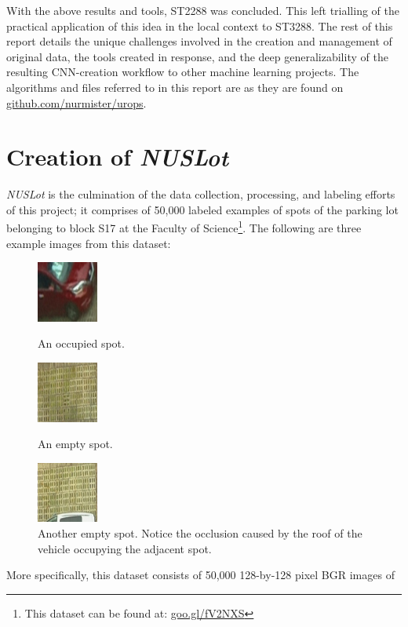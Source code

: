 \documentclass[a4paper, 11pt]{article} %
\begin{document}
	\newpage
	With the above results and tools, ST2288 was concluded. This left trialling of the practical 
	application of this idea in the local context to ST3288. The rest of this report details the unique 
	challenges involved in the creation and management of original data, the tools created in response, 
	and the deep generalizability of the resulting CNN-creation workflow to other machine learning 
	projects. The algorithms and files referred to in this report are as they are found on  
	\hyperlink{https://github.com/nurmister/urops}{github.com/nurmister/urops}.
\newpage
\section{Creation of \textit{NUSLot}}
	\textit{NUSLot} is the culmination of the data collection, processing, and labeling efforts of this 
	project; it comprises of 50,000 labeled examples of spots of the parking lot belonging to block 
	S17 at the Faculty of Science\footnote{This dataset can be found at: 
	\hyperlink{https://goo.gl/fV2NXS}{goo.gl/fV2NXS}}. The following are three example images 
	from this dataset:
	\vskip 5mm
	\begin{figure}[H]
		\centering
		\includegraphics[width=2cm]{figures/nuslot_example_1.jpg}
		\caption{An occupied spot.}
		\vspace{5mm}
		\includegraphics[width=2cm]{figures/nuslot_example_2.jpg}
		\caption{An empty spot.}
		\vspace{5mm}
		\includegraphics[width=2cm]{figures/nuslot_example_3.jpg}
		\caption{Another empty spot. Notice the occlusion caused by the roof of the vehicle occupying 
		the adjacent spot.}
	\end{figure}
	\hspace*{-6mm}More specifically, this dataset consists of 50,000 128-by-128 pixel BGR images of 
\end{document}

